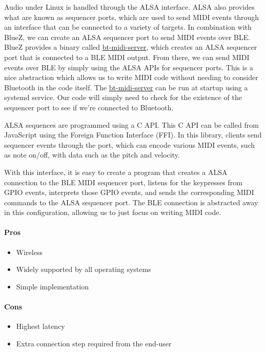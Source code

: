 Audio under Linux is handled through the ALSA interface. ALSA also provides what are known
as sequencer ports, which are used to send MIDI events through an interface that can be
connected to a variety of targets. In combination with BlueZ, we can create an ALSA
sequencer port to send MIDI events over BLE. BlueZ provides a binary called
\url{bt-midi-server}, which creates an ALSA sequencer port that is connected to a BLE MIDI
output. From there, we can send MIDI events over BLE by simply using the ALSA APIs for
sequencer ports. This is a nice abstraction which allows us to write MIDI code without
needing to consider Bluetooth in the code itself. The \url{bt-midi-server} can be run at
startup using a systemd service. Our code will simply need to check for the existence of
the sequencer port to see if we're connected to Bluetooth.

ALSA sequences are programmed using a C API. This C API can be called from JavaScript
using the Foreign Function Interface (FFI). In this library, clients send sequencer events
through the port, which can encode various MIDI events, such as note on/off, with data
such as the pitch and velocity.

With this interface, it is easy to create a program that creates a ALSA connection to the
BLE MIDI sequencer port, listens for the keypresses from GPIO events, interprets those
GPIO events, and sends the corresponding MIDI commands to the ALSA sequencer port. The BLE
connection is abstracted away in this configuration, allowing us to just focus on writing
MIDI code.

\paragraph{Pros}

\begin{itemize}
  \item Wireless
  \item Widely supported by all operating systems
  \item Simple implementation
\end{itemize}

\paragraph{Cons}

\begin{itemize}
  \item Highest latency
  \item Extra connection step required from the end-user
\end{itemize}

